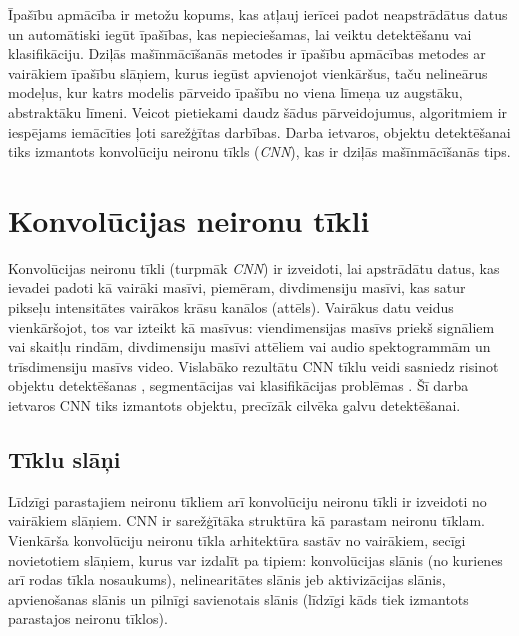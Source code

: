 Īpašību apmācība ir metožu kopums, kas atļauj ierīcei padot neapstrādātus datus un automātiski iegūt īpašības, kas nepieciešamas, lai veiktu detektēšanu vai klasifikāciju. Dziļās mašīnmācīšanās metodes ir īpašību apmācības metodes ar vairākiem īpašību slāņiem, kurus iegūst apvienojot vienkāršus, taču nelineārus modeļus, kur katrs modelis pārveido īpašību no viena līmeņa uz augstāku, abstraktāku līmeni. Veicot pietiekami daudz šādus pārveidojumus, algoritmiem ir iespējams iemācīties ļoti sarežģītas darbības.\cite{deepnet} Darba ietvaros, objektu detektēšanai tiks izmantots konvolūciju neironu tīkls (\textit{CNN}), kas ir dziļās mašīnmācīšanās tips.

\section{Konvolūcijas neironu tīkli}
Konvolūcijas neironu tīkli (turpmāk \textit{CNN}) ir izveidoti, lai apstrādātu datus, kas ievadei padoti kā vairāki masīvi, piemēram, divdimensiju masīvi, kas satur pikseļu intensitātes vairākos krāsu kanālos (attēls). Vairākus datu veidus vienkāršojot, tos var izteikt kā masīvus: viendimensijas masīvs priekš signāliem vai skaitļu rindām, divdimensiju masīvi attēliem vai audio spektogrammām un trīsdimensiju masīvs video. Vislabāko rezultātu CNN tīklu veidi sasniedz risinot objektu detektēšanas \cite{li2015convolutional}\cite{matsugu2003subject}, segmentācijas \cite{long2015fully} vai klasifikācijas problēmas \cite{classif}\cite{krizhevsky2012imagenet}\cite{jia2014caffe}. Šī darba ietvaros CNN tiks izmantots objektu, precīzāk cilvēka galvu detektēšanai.

\subsection{Tīklu slāņi}
Līdzīgi parastajiem neironu tīkliem arī konvolūciju neironu tīkli ir izveidoti no vairākiem slāņiem. CNN ir sarežģītāka struktūra kā parastam neironu tīklam. Vienkārša konvolūciju neironu tīkla arhitektūra sastāv no vairākiem, secīgi novietotiem slāņiem, kurus var izdalīt pa tipiem: konvolūcijas slānis (no kurienes arī rodas tīkla nosaukums), nelinearitātes slānis jeb aktivizācijas slānis, apvienošanas slānis un pilnīgi savienotais slānis (līdzīgi kāds tiek izmantots parastajos neironu tīklos). 
